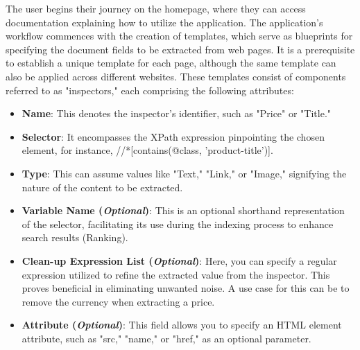 The user begins their journey on the homepage, where they can access documentation explaining how to utilize the application. The application's workflow commences with the creation of templates, which serve as blueprints for specifying the document fields to be extracted from web pages. It is a prerequisite to establish a unique template for each page, although the same template can also be applied across different websites. These templates consist of components referred to as "inspectors," each comprising the following attributes:

\begin{itemize}
  \item \textbf{Name}: This denotes the inspector's identifier, such as "Price" or "Title."

\item \textbf{Selector}: It encompasses the XPath expression pinpointing the chosen element, for instance, //*[contains(@class, 'product-title')].

\item \textbf{Type}: This can assume values like "Text," "Link," or "Image," signifying the nature of the content to be extracted.

\item \textbf{Variable Name (\textit{Optional})}: This is an optional shorthand representation of the selector, facilitating its use during the indexing process to enhance search results (Ranking).

\item \textbf{Clean-up Expression List (\textit{Optional})}: Here, you can specify a regular expression utilized to refine the extracted value from the inspector. This proves beneficial in eliminating unwanted noise. A use case for this can be to remove the currency when extracting a price.

\item \textbf{Attribute (\textit{Optional})}: This field allows you to specify an HTML element attribute, such as "src," "name," or "href," as an optional parameter.
\end{itemize}


